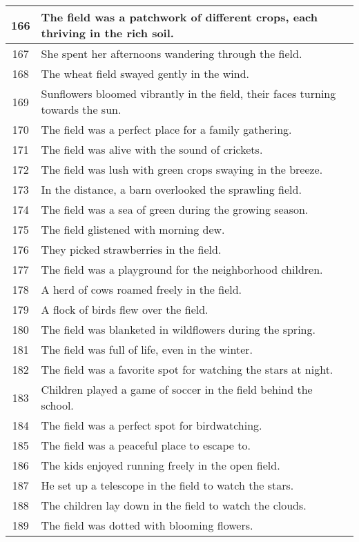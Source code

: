 \begin{longtable}{|c|p{12cm}|}
166 & The field was a patchwork of different crops, each thriving in the rich soil. \\ \hline
167 & She spent her afternoons wandering through the field. \\ \hline
168 & The wheat field swayed gently in the wind. \\ \hline
169 & Sunflowers bloomed vibrantly in the field, their faces turning towards the sun. \\ \hline
170 & The field was a perfect place for a family gathering. \\ \hline
171 & The field was alive with the sound of crickets. \\ \hline
172 & The field was lush with green crops swaying in the breeze. \\ \hline
173 & In the distance, a barn overlooked the sprawling field. \\ \hline
174 & The field was a sea of green during the growing season. \\ \hline
175 & The field glistened with morning dew. \\ \hline
176 & They picked strawberries in the field. \\ \hline
177 & The field was a playground for the neighborhood children. \\ \hline
178 & A herd of cows roamed freely in the field. \\ \hline
179 & A flock of birds flew over the field. \\ \hline
180 & The field was blanketed in wildflowers during the spring. \\ \hline
181 & The field was full of life, even in the winter. \\ \hline
182 & The field was a favorite spot for watching the stars at night. \\ \hline
183 & Children played a game of soccer in the field behind the school. \\ \hline
184 & The field was a perfect spot for birdwatching. \\ \hline
185 & The field was a peaceful place to escape to. \\ \hline
186 & The kids enjoyed running freely in the open field. \\ \hline
187 & He set up a telescope in the field to watch the stars. \\ \hline
188 & The children lay down in the field to watch the clouds. \\ \hline
189 & The field was dotted with blooming flowers. \\ \hline

\end{longtable}
